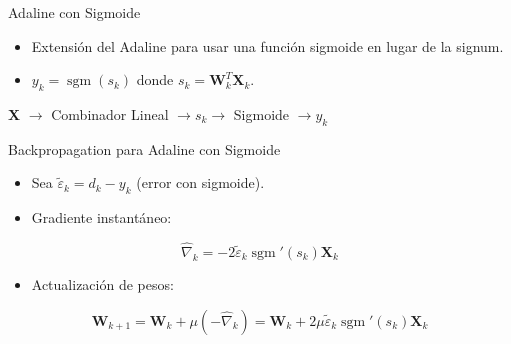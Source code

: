 \documentclass[aspectratio=169,utf8,spanish]{beamer}
\DeclareMathOperator{\sgm}{sgm}
\begin{document}

\begin{frame}{Adaline con Sigmoide}
  \begin{itemize}
    \item Extensión del Adaline para usar una función sigmoide en lugar de la signum.
    \item $y_k = \sgm(s_k)$ donde $s_k = \mathbf{W}_k^T \mathbf{X}_k$.
  \end{itemize}
  \begin{center}
    \textbf{X} $\to$ Combinador Lineal $\to s_k \to$ Sigmoide $\to y_k$
  \end{center}
\end{frame}

\begin{frame}{Backpropagation para Adaline con Sigmoide}
  \begin{itemize}
    \item Sea $\tilde{\varepsilon}_k = d_k - y_k$ (error con sigmoide).
    \item Gradiente instantáneo:
  \end{itemize}
  \begin{equation*}
    \hat{\nabla}_k = -2\tilde{\varepsilon}_k \sgm'(s_k) \mathbf{X}_k
  \end{equation*}
  \begin{itemize}
    \item Actualización de pesos:
  \end{itemize}
  \begin{equation*}
    \mathbf{W}_{k+1} = \mathbf{W}_k + \mu(-\hat{\nabla}_k) = \mathbf{W}_k + 2\mu\tilde{\varepsilon}_k \sgm'(s_k) \mathbf{X}_k
  \end{equation*}
\end{frame}
\end{document}
